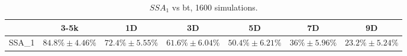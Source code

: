 \begin{table}[htbp]
    \centering
    \label{tab:my-table}
    \begin{tabular}{ccccccc}
        \toprule
        & 3-5k & 1D & 3D & 5D & 7D & 9D \\
        \midrule
        SSA_1 & $84.8\%\pm4.46\%$ & $72.4\%\pm5.55\%$ & $61.6\%\pm6.04\%$ & $50.4\%\pm6.21\%$ & $36\%\pm5.96\%$ & $23.2\%\pm5.24\%$ \\
        \bottomrule
    \end{tabular}
    \caption{$SSA_{1}$ vs bt, 1600 simulations.}
\end{table}
